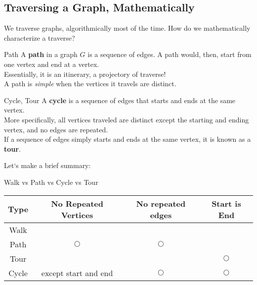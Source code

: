 \subsection{Traversing a Graph, Mathematically}
We traverse graphs, algorithmically most of the time. How do we mathematically characterize a traverse?
\begin{ln-define}{Path}{}
    A \textbf{path} in a graph $G$ is a sequence of edges. A path would, then, start from one vertex and end at a vertex. \\
    Essentially, it is an itinerary, a projectory of traverse! \\
    A path is \textit{simple} when the vertices it travels are distinct.
\end{ln-define}
\begin{ln-define}{Cycle, Tour}{}
    A \textbf{cycle} is a sequence of edges that starts and ends at the same vertex. \\
    More specifically, all vertices traveled are distinct except the starting and ending vertex, and no edges are repeated. \\
    If a sequence of edges simply starts and ends at the same vertex, it is known as a \textbf{tour}.
\end{ln-define}
Let`s make a brief summary:
\begin{ln-fig}{Walk vs Path vs Cycle vs Tour}{}
    \begin{center}
        \begin{tabular}{c||c|c|c}
            Type & No Repeated Vertices & No repeated edges & Start is End \\
            \hline
            \hline
            Walk & & & \\
            \hline
            Path & $\bigcirc$ & $\bigcirc$ & \\
            \hline
            Tour & & & $\bigcirc$ \\
            \hline
            Cycle & except start and end & $\bigcirc$ & $\bigcirc$
        \end{tabular}
    \end{center}
\end{ln-fig}

